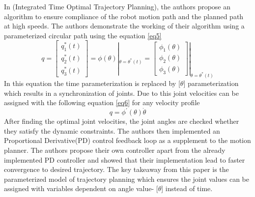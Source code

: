 In \cite{4}(Integrated Time Optimal Trajectory Planning), the authors propose an algorithm to ensure compliance of the robot motion path and the planned path at high speeds. The authors demonstrate the working of their algorithm using a parameterized circular path using the equation \eqref{eq5}
\begin{equation}
\label{eq5}
q= \begin{bmatrix} q_{1}^{*}(t)\\ q_{2}^{*}(t)\\ q_{3}^{*}(t) \end{bmatrix} = \phi (\theta)|_{\theta=\theta^{*}(t)} = \begin{bmatrix} \phi_{1}(\theta)\\ \phi_{2}(\theta)\\ \phi_{3}(\theta) \end{bmatrix}|_{\theta=\theta^{*}(t)}
\end{equation}
In this equation the time parameterization is replaced by [$\theta$] parameterization which results in a synchronization of joints. Due to this joint velocities can be assigned with the following equation \eqref{eq6} for any velocity profile
\begin{equation}
\label{eq6}
q=\phi^{'}(\theta)\dot{\theta}
\end{equation}
After finding the optimal joint velocities, the joint angles are checked whether they satisfy the dynamic constraints. The authors then implemented an Proportional Derivative(PD) control feedback loop as a supplement to the motion planner. The authors propose their own controller apart from the already implemented PD controller and showed that their implementation lead to faster convergence to desired trajectory. The key takeaway from this paper is the parameterized model of trajectory planning which ensures the joint values can be assigned with variables dependent on angle value- [$\theta$] instead of time. 
